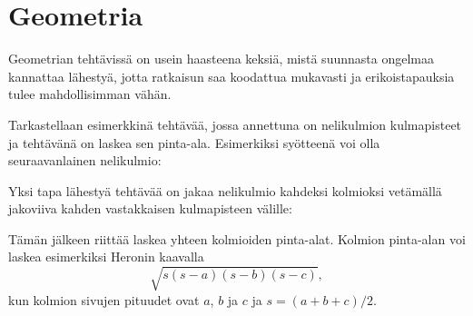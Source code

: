 \chapter{Geometria}


Geometrian tehtävissä on usein haasteena keksiä,
mistä suunnasta ongelmaa kannattaa lähestyä,
jotta ratkaisun saa koodattua mukavasti ja
erikoistapauksia tulee mahdollisimman vähän.

Tarkastellaan esimerkkinä tehtävää,
jossa annettuna on nelikulmion kulmapisteet
ja tehtävänä on laskea sen pinta-ala.
Esimerkiksi syötteenä voi olla
seuraavanlainen nelikulmio:

\begin{center}
\end{center}
Yksi tapa lähestyä tehtävää on jakaa nelikulmio
kahdeksi kolmioksi vetämällä jakoviiva kahden
vastakkaisen kulmapisteen välille:
\begin{center}
\end{center}
Tämän jälkeen riittää laskea yhteen kolmioiden
pinta-alat. Kolmion pinta-alan voi laskea
esimerkiksi Heronin kaavalla
\[ \sqrt{s (s-a) (s-b) (s-c)},\]
kun kolmion sivujen pituudet ovat
$a$, $b$ ja $c$ ja $s=(a+b+c)/2$.

